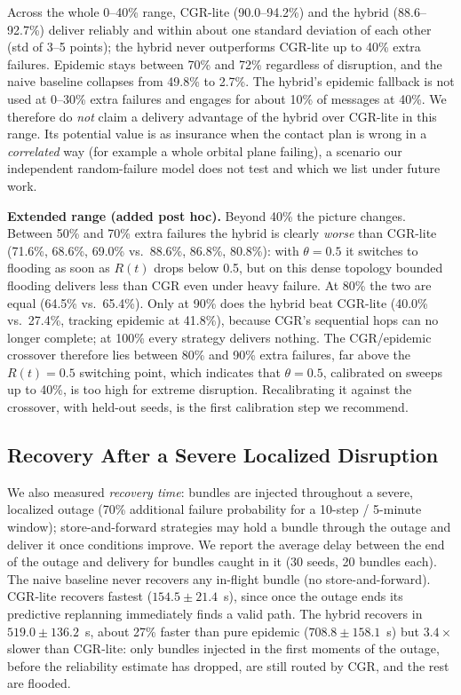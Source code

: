 \documentclass[10pt,twocolumn]{article}
\begin{document}
Across the whole 0--40\% range, CGR-lite (90.0--94.2\%) and the hybrid (88.6--92.7\%) deliver reliably and within about one standard deviation of each other (std of 3--5 points); the hybrid never outperforms CGR-lite up to 40\% extra failures. Epidemic stays between 70\% and 72\% regardless of disruption, and the naive baseline collapses from 49.8\% to 2.7\%. The hybrid's epidemic fallback is not used at 0--30\% extra failures and engages for about 10\% of messages at 40\%. We therefore do \emph{not} claim a delivery advantage of the hybrid over CGR-lite in this range. Its potential value is as insurance when the contact plan is wrong in a \emph{correlated} way (for example a whole orbital plane failing), a scenario our independent random-failure model does not test and which we list under future work.

\textbf{Extended range (added post hoc).} Beyond 40\% the picture changes. Between 50\% and 70\% extra failures the hybrid is clearly \emph{worse} than CGR-lite (71.6\%, 68.6\%, 69.0\% vs.\ 88.6\%, 86.8\%, 80.8\%): with $\theta=0.5$ it switches to flooding as soon as $R(t)$ drops below 0.5, but on this dense topology bounded flooding delivers less than CGR even under heavy failure. At 80\% the two are equal (64.5\% vs.\ 65.4\%). Only at 90\% does the hybrid beat CGR-lite (40.0\% vs.\ 27.4\%, tracking epidemic at 41.8\%), because CGR's sequential hops can no longer complete; at 100\% every strategy delivers nothing. The CGR/epidemic crossover therefore lies between 80\% and 90\% extra failures, far above the $R(t)=0.5$ switching point, which indicates that $\theta=0.5$, calibrated on sweeps up to 40\%, is too high for extreme disruption. Recalibrating it against the crossover, with held-out seeds, is the first calibration step we recommend.

\subsection{Recovery After a Severe Localized Disruption}
We also measured \emph{recovery time}: bundles are injected throughout a severe, localized outage (70\% additional failure probability for a 10-step / 5-minute window); store-and-forward strategies may hold a bundle through the outage and deliver it once conditions improve. We report the average delay between the end of the outage and delivery for bundles caught in it (30 seeds, 20 bundles each). The naive baseline never recovers any in-flight bundle (no store-and-forward). CGR-lite recovers fastest ($154.5 \pm 21.4$~s), since once the outage ends its predictive replanning immediately finds a valid path. The hybrid recovers in $519.0 \pm 136.2$~s, about 27\% faster than pure epidemic ($708.8 \pm 158.1$~s) but $3.4\times$ slower than CGR-lite: only bundles injected in the first moments of the outage, before the reliability estimate has dropped, are still routed by CGR, and the rest are flooded.
\end{document}
